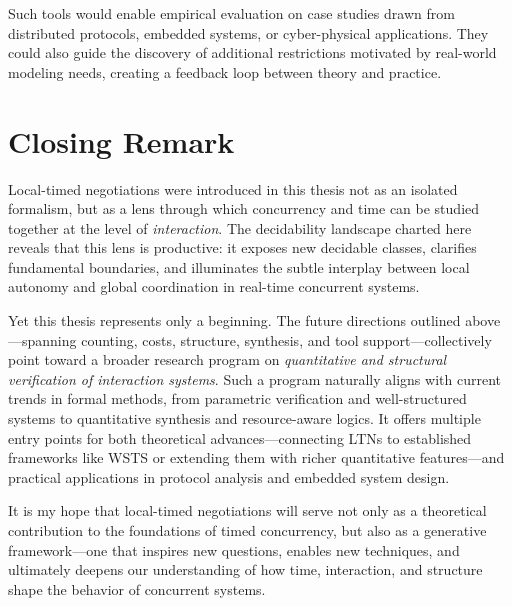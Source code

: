 Such tools would enable empirical evaluation on case studies drawn from distributed protocols, embedded systems, or cyber-physical applications. They could also guide the discovery of additional restrictions motivated by real-world modeling needs, creating a feedback loop between theory and practice.

\section*{Closing Remark}

Local-timed negotiations were introduced in this thesis not as an isolated formalism, but as a lens through which concurrency and time can be studied together at the level of \emph{interaction}. The decidability landscape charted here reveals that this lens is productive: it exposes new decidable classes, clarifies fundamental boundaries, and illuminates the subtle interplay between local autonomy and global coordination in real-time concurrent systems.

Yet this thesis represents only a beginning. The future directions outlined above—spanning counting, costs, structure, synthesis, and tool support—collectively point toward a broader research program on \emph{quantitative and structural verification of interaction systems}. Such a program naturally aligns with current trends in formal methods, from parametric verification and well-structured systems to quantitative synthesis and resource-aware logics. It offers multiple entry points for both theoretical advances—connecting LTNs to established frameworks like WSTS or extending them with richer quantitative features—and practical applications in protocol analysis and embedded system design.

It is my hope that local-timed negotiations will serve not only as a theoretical contribution to the foundations of timed concurrency, but also as a generative framework—one that inspires new questions, enables new techniques, and ultimately deepens our understanding of how time, interaction, and structure shape the behavior of concurrent systems.